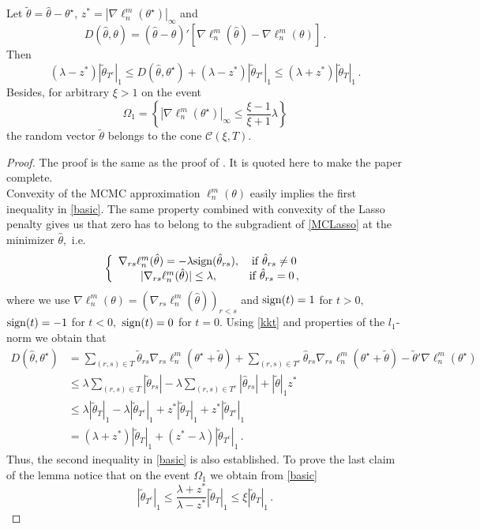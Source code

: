 \documentclass[twoside,11pt]{article}
\def\llnm{\ell_n^m}
\def\th{\theta}
\def\cone{\mathcal{C}}
\def\tth{\tilde{\theta}}
\def\ths{\th^\star}
\def\hth{\hat{\theta}}
\def\rs{_{rs}}
\def\grad{\nabla}
\begin{document}
\begin{lemma}
\label{basiclem}
Let $\tth = \hth - \ths$, $z^* = |\grad \llnm(\ths)|_\infty$ and 
\[D(\hth, \th)= (\hth-\th)' \left[\grad \llnm(\hth) - \grad\llnm (\th) \right]\,.\] Then 
\begin{equation}
\label{basic}
(\lambda - z^*) |\tth_{T^c}|_1 \leq D(\hth, \ths) + (\lambda - z^*) |\tth_{T^c}|_1 
\leq (\lambda + z^*) |\tth_{T}|_1\, .
\end{equation}
Besides, for arbitrary $\xi >1$ on the event 
\begin{equation}
\label{omega1}
\Omega_1=\left\{ |\grad \llnm (\ths)|_\infty \leq \frac{\xi -1}{\xi +1} \lambda \right\}
\end{equation} 
 the random vector $\tth$ belongs to the cone $\cone (\xi, T).$ 
\end{lemma}
\begin{proof}
The proof is the same as the proof of \citet[Lemma 3.1]{Cox13}. It is quoted here to make the paper complete.\\
Convexity of the MCMC approximation $\llnm(\th)$ easily implies the first inequality in \eqref{basic}. The same property combined with convexity of the Lasso penalty gives us
that zero has to belong to the subgradient of \eqref{MCLasso} at the minimizer $\hth,$ i.e.
\begin{equation}
\label{kkt}
\left\{
\begin{array}{cc}
\grad \rs \llnm(\hth) = -\lambda {\rm sign} (\hth _{rs}), & {\rm if} \; \hth \rs \neq 0\\
|\grad \rs \llnm(\hth)| \leq \lambda, & {\rm if} \; \hth \rs = 0\,,
\end{array}
\right.
\end{equation}
where we use $\grad  \llnm(\th)= \left(\grad \rs \llnm(\hth) \right)_{r<s}$ and ${\rm sign}(t)=1$ for $t>0,$ ${\rm sign}(t)=-1$ for $t<0,$ ${\rm sign}(t)=0$ for $t=0.$ 
Using \eqref{kkt} and properties of the $l_1$-norm we obtain that
\begin{align*}
D(\hth, \ths)  &= \sum_{(r,s) \in T} \tth \rs \grad \rs \llnm(\ths+\tth) +
\sum_{(r,s) \in T^c} \hth \rs \grad \rs \llnm(\ths+\tth) - \tth ' \grad \llnm (\ths) \\
&\leq \lambda \sum_{(r,s) \in T} |\tth \rs|  - \lambda \sum_{(r,s) \in T^c} |\hth \rs|
+|\tth|_1 z^*\\
&\leq \lambda |\tth _T|_1 - \lambda |\tth _{T^c}|_1 + z^* |\tth _T|_1 +z^* |\tth _{T^c}|_1 \\
&= (\lambda +z^*) |\tth _T|_1 + (z^*- \lambda) |\tth _{T^c}|_1\, .
\end{align*}
Thus, the second inequality in \eqref{basic} is also established. To prove the last claim of the lemma notice that on the event $\Omega _1$ we obtain
from \eqref{basic} 
\[
|\tth _{T^c}|_1 \leq \frac{\lambda+z^*}{\lambda-z^*} |\tth _T|_1 \leq \xi |\tth _T|_1\, .
\] 
\end{proof}
\end{document}
